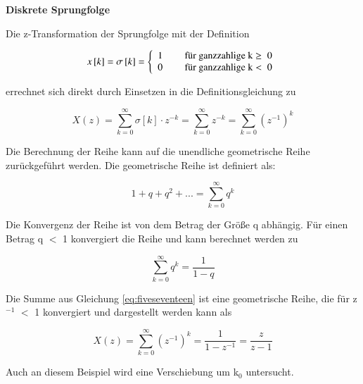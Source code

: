{\selectfont
\noindent\textbf{Diskrete Sprungfolge}}\smallskip

\noindent Die z-Transformation der Sprungfolge mit der Definition

\begin{equation}\label{eq:fivesixteen}
x\left[k\right]=\sigma \left[k\right]=\left\{\begin{array}{l} 
{1\rm \qquad \text{ für ganzzahlige k} \ge {\rm \; 0}} \\ 
{\rm 0 \qquad \text{ für ganzzahlige k} <{\rm \; 0}} \end{array}\right. 
\end{equation}

\noindent errechnet sich direkt durch Einsetzen in die Definitionsgleichung zu

\begin{equation}\label{eq:fiveseventeen}
X\left(z\right)=\sum _{k=0}^{\infty }\sigma \left[k\right]\cdot z^{-k}  =\sum _{k=0}^{\infty }z^{-k}  =\sum _{k=0}^{\infty }\left(z^{-1} \right)^{k} 
\end{equation}

\noindent Die Berechnung der Reihe kann auf die unendliche geometrische Reihe zur\"{u}ckgef\"{u}hrt werden. Die geometrische Reihe ist definiert als:

\begin{equation}\label{eq:fiveeighteen}
1+q+q^{2} +...=\sum _{k=0}^{\infty }q^{k} 
\end{equation}

\noindent Die Konvergenz der Reihe ist von dem Betrag der Gr\"{o}{\ss}e q abh\"{a}ngig. F\"{u}r einen Betrag {\textbar}q{\textbar} $\mathrm{<}$ 1 konvergiert die Reihe und kann berechnet werden zu

\begin{equation}\label{eq:fivenineteen}
\sum _{k=0}^{\infty }q^{k}  =\frac{1}{1-q} 
\end{equation}

\noindent Die Summe aus Gleichung \eqref{eq:fiveseventeen} ist eine geometrische Reihe, die f\"{u}r {\textbar}z${}^{-1}${\textbar} $\mathrm{<}$ 1 konvergiert und dargestellt werden kann als

\begin{equation}\label{eq:fivetwenty}
X\left(z\right)=\sum _{k=0}^{\infty }\left(z^{-1} \right)^{k}  =\frac{1}{1-z^{-1} } =\frac{z}{z-1}
\end{equation}

\noindent Auch an diesem Beispiel wird eine Verschiebung um k${}_{0}$ untersucht. 

